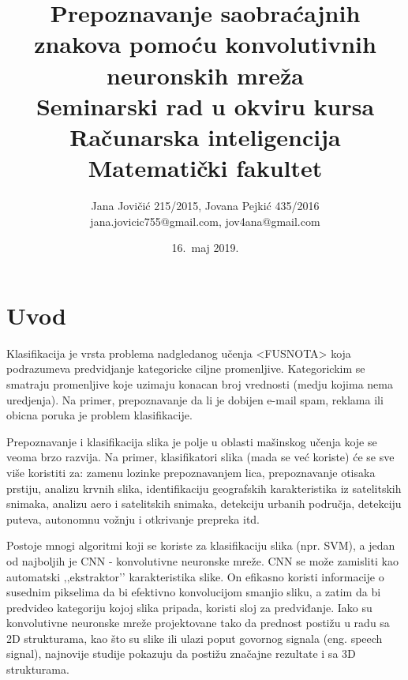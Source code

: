 \documentclass[a4paper]{article}
\begin{document}
\title{Prepoznavanje saobraćajnih znakova pomoću konvolutivnih neuronskih mreža\\ \small{Seminarski rad u okviru kursa\\Računarska inteligencija\\ Matematički fakultet}}

\author{Jana Jovičić 215/2015, Jovana Pejkić 435/2016 \\ jana.jovicic755@gmail.com, jov4ana@gmail.com}

\date{16.~maj 2019.}

\maketitle

\abstract{

}

\newpage

\tableofcontents

\newpage

\section{Uvod}
\label{sec:uvod}

Klasifikacija je vrsta problema nadgledanog učenja <FUSNOTA> koja podrazumeva predvidjanje kategoricke ciljne promenljive. Kategorickim se smatraju promenljive koje uzimaju konacan broj vrednosti (medju kojima nema uredjenja). Na primer, prepoznavanje da li je dobijen e-mail spam, reklama ili obicna poruka je problem klasifikacije.

Prepoznavanje i klasifikacija slika je polje u oblasti mašinskog učenja koje se veoma brzo razvija. Na primer, klasifikatori slika (mada se već koriste) će se sve više koristiti za: zamenu lozinke prepoznavanjem lica, prepoznavanje otisaka prstiju, analizu krvnih slika, identifikaciju geografskih karakteristika iz satelitskih snimaka, analizu aero i satelitskih snimaka, detekciju urbanih područja, detekciju puteva, autonomnu vožnju i otkrivanje prepreka itd.

Postoje mnogi algoritmi koji se koriste za klasifikaciju slika (npr. SVM), a jedan od najboljih je CNN - konvolutivne neuronske mreže. CNN se može zamisliti kao automatski ‚‚ekstraktor’’ karakteristika slike. On efikasno koristi informacije o susednim pikselima da bi efektivno konvolucijom smanjio sliku, a zatim da bi predvideo kategoriju kojoj slika pripada, koristi sloj za predviđanje. Iako su konvolutivne neuronske mreže projektovane tako da prednost postižu u radu sa 2D strukturama, kao što su slike ili ulazi poput govornog signala (eng. speech signal), najnovije studije pokazuju da postižu značajne rezultate i sa 3D strukturama.
\end{document}

